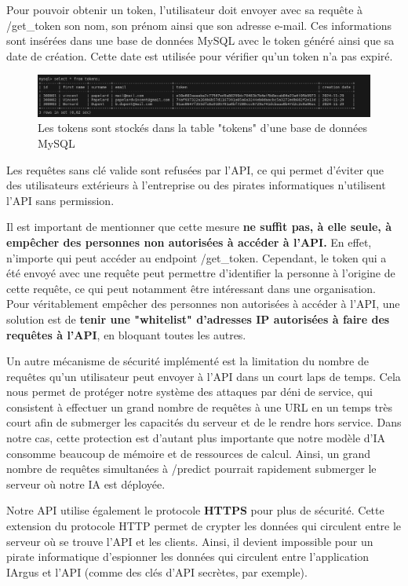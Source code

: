 \documentclass[french]{article}
\begin{document}
    Pour pouvoir obtenir un token, l'utilisateur doit envoyer avec sa requête à /get\_token son nom, son prénom ainsi que son adresse e-mail. Ces informations sont insérées dans une base de données MySQL avec le token généré ainsi que sa date de création. Cette date est utilisée pour vérifier qu'un token n'a pas expiré.

    \begin{figure}[h!]
        \includegraphics[width=12cm]{db_tokens}
        \centering
        \caption{Les tokens sont stockés dans la table "tokens" d'une base de données MySQL}
        \centering
    \end{figure}

    Les requêtes sans clé valide sont refusées par l'API, ce qui permet d'éviter que des utilisateurs extérieurs à l'entreprise ou des pirates informatiques n'utilisent l'API sans permission.

    Il est important de mentionner que cette mesure \textbf{ne suffit pas, à elle seule, à empêcher des personnes non autorisées à accéder à l'API.} En effet, n'importe qui peut accéder au endpoint /get\_token. Cependant, le token qui a été envoyé avec une requête peut permettre d'identifier la personne à l'origine de cette requête, ce qui peut notamment être intéressant dans une organisation. Pour véritablement empêcher des personnes non autorisées à accéder à l'API, une solution est de \textbf{tenir une "whitelist" d'adresses IP autorisées à faire des requêtes à l'API}, en bloquant toutes les autres.


    Un autre mécanisme de sécurité implémenté est la limitation du nombre de requêtes qu'un utilisateur peut envoyer à l'API dans un court laps de temps. Cela nous permet de protéger notre système des attaques par déni de service, qui consistent à effectuer un grand nombre de requêtes à une URL en un temps très court afin de submerger les capacités du serveur et de le rendre hors service. Dans notre cas, cette protection est d'autant plus importante que notre modèle d'IA consomme beaucoup de mémoire et de ressources de calcul. Ainsi, un grand nombre de requêtes simultanées à /predict pourrait rapidement submerger le serveur où notre IA est déployée.

    Notre API utilise également le protocole \textbf{HTTPS} pour plus de sécurité. Cette extension du protocole HTTP permet de crypter les données qui circulent entre le serveur où se trouve l'API et les clients. Ainsi, il devient impossible pour un pirate informatique d'espionner les données qui circulent entre l'application IArgus et l'API (comme des clés d'API secrètes, par exemple).
\end{document}
